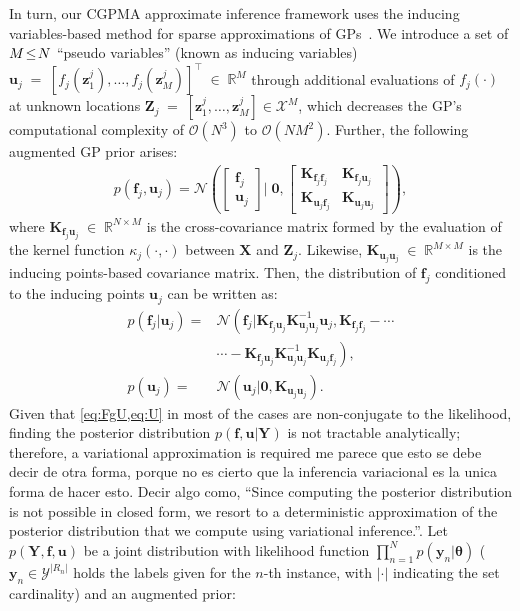 \documentclass[journal]{IEEEtran}
\providecommand{\ve}[1]{{\bm{#1}}}%
\providecommand{\mat}[1]{{\bm{#1}}} %
\newcommand{\Real}{\mathbb{R}}
\DeclareMathOperator{\en}{\!\,\in\!\,}
\DeclareMathOperator{\igual}{\!\,=\!\,}
\providecommand{\s}[1]{\negthinspace#1\negthinspace}%
\providecommand{\ve}[1]{{\mathbf{#1}}}
\providecommand{\mat}[1]{{\mathbf{#1}}}
\newcommand{\gauss}{\mathcal{N}} %
\newcommand{\comment}[2]{{\color{blue}#1} {\color{red}#2}}
\begin{document}
In turn, our CGPMA approximate inference framework uses the inducing variables-based method for sparse approximations of GPs~\cite{hensman2015scalable}. We introduce a set of $M\s{\leq}N$ ``pseudo variables'' (known as inducing variables) $\ve{u}_j \igual [f_j(\ve{z}_1^j), \dots , f_j(\ve{z}_M^j)]^{\top}\en \Real^{M}$ through additional evaluations of $f_j(\cdot)$ at unknown locations $\mat{Z}_j \igual [\ve{z}_1^j, \dots , \ve{z}_M^j]\in \mathcal{X}^{M}$, which decreases the GP's computational complexity of $\mathcal{O}(N^3)$ to $\mathcal{O}(NM^2)$. Further, the following augmented GP prior arises:
\begin{align}
p(\ve{f}_j,\ve{u}_j) = \gauss\left(\begin{bmatrix}
\ve{f}_j\\\ve{u}_j\end{bmatrix} \Bigg|\; \mathbf{0}, \begin{bmatrix}
\mat{K}_{\ve{f}_j\ve{f}_j} & \mat{K}_{\ve{f}_j\ve{u}_j}\\ \mat{K}_{\ve{u}_j\ve{f}_j} & \mat{K}_{\ve{u}_j\ve{u}_j}
\end{bmatrix}\right),
\end{align}
where $\mat{K}_{\ve{f}_j\ve{u}_j}\en\Real^{N\times M}$ is the cross-covariance matrix formed by the evaluation of the kernel function $\kappa_j(\cdot, \cdot)$ between $\mat{X}$ and $\mat{Z}_j$. Likewise, $\mat{K}_{\ve{u}_j\ve{u}_j}\en\Real^{M\times M}$ is the inducing points-based covariance matrix. Then, the distribution of $\ve{f}_j$ conditioned to the inducing points $\ve{u}_j$ can be written as:
\begin{align}
\label{eq:FgU}
p(\ve{f}_j|\ve{u}_j) =&\gauss\left(\ve{f}_j|\mat{K}_{\ve{f}_j\ve{u}_j}\mat{K}_{\ve{u}_j\ve{u}_j}^{-1}\ve{u}_j,\mat{K}_{\ve{f}_j\ve{f}_j}-\cdots\right.\\ \nonumber
&\left.\cdots-\mat{K}_{\ve{f}_j\ve{u}_j}\mat{K}_{\ve{u}_j\ve{u}_j}^{-1}\mat{K}_{\ve{u}_j\ve{f}_j}\right),\\
p(\ve{u}_j) =& \gauss\left(\ve{u}_j|\ve{0}, \mat{K}_{\ve{u}_j\ve{u}_j}\right).
\label{eq:U}
\end{align}
Given that \cref{eq:FgU,eq:U} in most of the cases are non-conjugate to the likelihood, finding the posterior distribution $p({\ve{f}},\mathbf{u}|\mathbf{Y})$ is not tractable analytically; \comment{therefore, a variational approximation is required}{me parece que esto se debe decir de otra forma, porque no es cierto que la inferencia variacional es la unica forma de hacer esto. Decir algo como, ``Since computing the posterior distribution is not possible in closed form, we resort to a deterministic approximation of the posterior distribution that we compute using variational inference.''}. Let $p(\mat{Y},{\ve{f}},{\ve{u}})$ be a joint distribution with likelihood function $\prod_{n=1}^{N}p(\ve{y}_n|\bm{\theta})$ ($\ve{y}_n\in \mathcal{Y}^{|R_n|}$ holds the labels given for the $n$-th instance, with $|\cdot|$ indicating the set cardinality) and an augmented prior:
\end{document}
